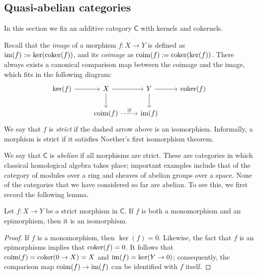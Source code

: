\subsection{Quasi-abelian categories}

In this section we fix an additive category  $\mathsf C$ 
with kernels and cokernels. 

Recall that the \emph{image} of a morphism $f \colon X \to Y$
is defined as $\mathrm{im}(f) := \ker(\operatorname{coker}(f))$, and its \emph{coimage}
as $\mathrm{coim}(f) := \operatorname{coker}(\ker(f))$.
There always exists a canonical comparison map between 
the coimage and the image, which fits in the following diagram:
\[
\begin{tikzcd}
\ker(f) \arrow{r} & X \arrow{d} \arrow{r} & Y \arrow{d}\arrow{r} & \coker(f)\\
& \coim(f) \arrow[dashed]{r}[above]{\exists!}& \im(f) & 
\end{tikzcd}
\]
We say that $f$ is \emph{strict} if the dashed arrow above is an isomorphism. Informally, 
a morphism is strict if it 
satisfies Noether's first isomorphism theorem. 

We say that $\mathsf C$ is \emph{abelian}
if all morphisms are strict. These are categories in which classical 
homological algebra takes place; important examples include that 
of the category of modules over a ring and sheaves 
of abelian groups over a space. None of the 
categories that we have considered so far are abelian. To see this, 
we first record the following lemma.

\begin{proposition}\label{prop:ab-epimono=iso} Let $f \colon X  \to Y$ be a strict morphism in $\mathsf C$. 
If $f$ is both a monomorphism and an epimorphism, then 
it is an isomorphism.
\end{proposition}
\begin{proof}
If $f$ is a monomorphism, then $\ker(f) = 0$. Likewise, the fact that $f$
is an epimorphisms implies that $\operatorname{coker}(f) = 0$. It follows that
$\mathrm{coim}(f) = \operatorname{coker}(0 \to X) = X$ and $\mathrm{im}(f) = \ker(Y \to 0)$; consequently, 
the comparison map $\mathrm{coim}(f) \to \mathrm{im}(f)$ can be identified with $f$ itself.
\end{proof}

